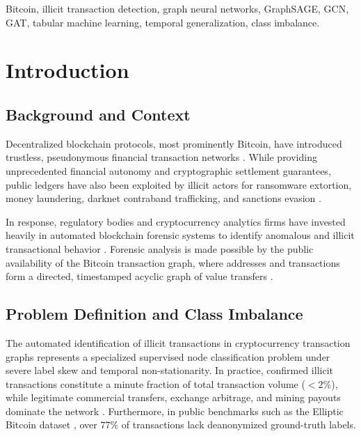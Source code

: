 \documentclass[conference]{IEEEtran}
\begin{document}
\begin{IEEEkeywords}
Bitcoin, illicit transaction detection, graph neural networks, GraphSAGE, GCN, GAT, tabular machine learning, temporal generalization, class imbalance.
\end{IEEEkeywords}

\section{Introduction}

\subsection{Background and Context}
Decentralized blockchain protocols, most prominently Bitcoin, have introduced trustless, pseudonymous financial transaction networks \cite{foley2019sex, meiklejohn2013fistful}. While providing unprecedented financial autonomy and cryptographic settlement guarantees, public ledgers have also been exploited by illicit actors for ransomware extortion, money laundering, darknet contraband trafficking, and sanctions evasion \cite{foley2019sex, moser2013inquiry}. 

In response, regulatory bodies and cryptocurrency analytics firms have invested heavily in automated blockchain forensic systems to identify anomalous and illicit transactional behavior \cite{harlev2018breaking, hu2019transaction}. Forensic analysis is made possible by the public availability of the Bitcoin transaction graph, where addresses and transactions form a directed, timestamped acyclic graph of value transfers \cite{reid2013analysis, meiklejohn2013fistful}.

\subsection{Problem Definition and Class Imbalance}
The automated identification of illicit transactions in cryptocurrency transaction graphs represents a specialized supervised node classification problem under severe label skew and temporal non-stationarity. In practice, confirmed illicit transactions constitute a minute fraction of total transaction volume ($< 2\%$), while legitimate commercial transfers, exchange arbitrage, and mining payouts dominate the network \cite{moser2013inquiry, he2009learning}. Furthermore, in public benchmarks such as the Elliptic Bitcoin dataset \cite{weber2019elliptic}, over $77\%$ of transactions lack deanonymized ground-truth labels. 
\end{document}
